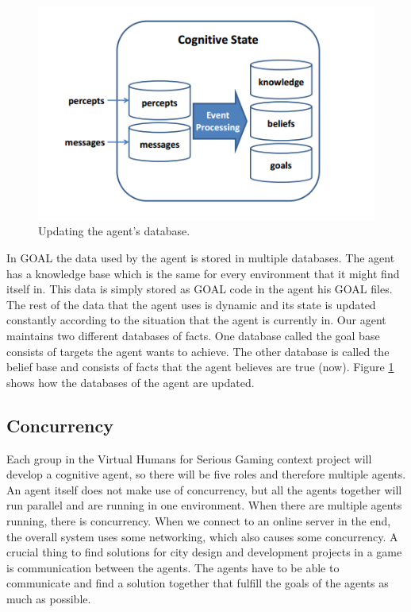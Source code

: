 \begin{figure}[h!]
  \includegraphics[width=\linewidth]{agentstate.png}
  \caption{Updating the agent's database.}
  \label{fig:agentstate1}
\end{figure}
In GOAL the data used by the agent is stored in multiple databases. The agent has a knowledge base which is the same for every environment that it might find itself in. This data is simply stored as GOAL code in the agent his GOAL files. The rest of the data that the agent uses is dynamic and its state is updated constantly according to the situation that the agent is currently in. Our agent maintains two different databases of facts. One database called the goal base consists of targets the agent wants to achieve. The other database is called the belief base and consists of facts that the agent believes are true (now). Figure \ref{fig:agentstate1} \cite{goal} shows how the databases of the agent are updated.



\newpage
\subsection{Concurrency}
Each group in the Virtual Humans for Serious Gaming context project will develop a cognitive agent, so there will be five roles and therefore multiple agents. An agent itself does not make use of concurrency, but all the agents together will run parallel and are running in one environment. When there are multiple agents running, there is concurrency. When we connect to an online server in the end, the overall system uses some networking, which also causes some concurrency. A crucial thing to find solutions for city design and development projects in a game is communication between the agents. The agents have to be able to communicate and find a solution together that fulfill the goals of the agents as much as possible.




